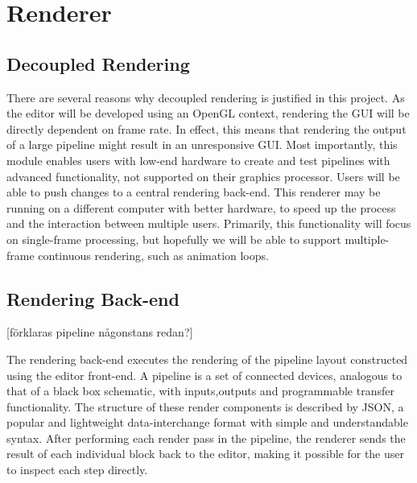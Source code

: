 
\chapter{Renderer}

\section{Decoupled Rendering}
There are several reasons why decoupled rendering is justified in this project. As the editor will be developed using an OpenGL context, rendering the GUI will be directly dependent on frame rate. In effect, this means that rendering the output of a large pipeline might result in an unresponsive GUI.
Most importantly, this module enables users with low-end hardware to create and test pipelines with advanced functionality, not supported on their graphics processor. Users will be able to push changes to a central rendering back-end. This renderer may be running on a different computer with better hardware, to speed up the process and the interaction between multiple users.  Primarily, this functionality will focus on single-frame processing, but hopefully we will be able to support multiple-frame continuous rendering, such as animation loops. 

\section{Rendering Back-end}

[förklaras pipeline någonstans redan?]

The rendering back-end executes the rendering of the pipeline layout constructed using the editor front-end. A pipeline is a set of connected devices, analogous to that of a black box schematic, with inputs,outputs and programmable transfer functionality. The structure of these render components is described by JSON, a popular and lightweight data-interchange format with simple and understandable syntax. After performing each render pass in the pipeline, the renderer sends the result of each individual block back to the editor, making it possible for the user to inspect each step directly. 